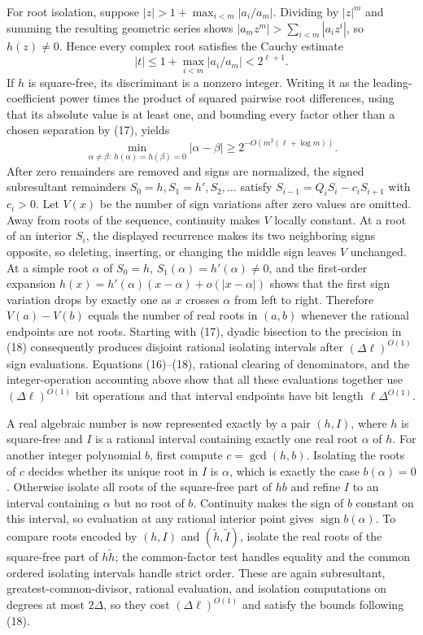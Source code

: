 For root isolation, suppose \(|z|>1+\max_{i<m}|a_i/a_m|\).  Dividing by \(|z|^m\) and summing the resulting geometric series shows \(|a_mz^m|>\sum_{i<m}|a_i z^i|\), so \(h(z)\ne0\).  Hence every complex root satisfies the Cauchy estimate
\[
|t|\le 1+\max_{i<m}|a_i/a_m|<2^{\ell+1}.
\tag{17}
\]
If \(h\) is square-free, its discriminant is a nonzero integer.  Writing it as the leading-coefficient power times the product of squared pairwise root differences, using that its absolute value is at least one, and bounding every factor other than a chosen separation by (17), yields
\[
\min_{\alpha\ne\beta:\ h(\alpha)=h(\beta)=0}|\alpha-\beta|
\ge 2^{-O(m^2(\ell+\log m))}.
\tag{18}
\]
After zero remainders are removed and signs are normalized, the signed subresultant remainders \(S_0=h,S_1=h',S_2,\ldots\) satisfy \(S_{i-1}=Q_iS_i-c_iS_{i+1}\) with \(c_i>0\).  Let \(V(x)\) be the number of sign variations after zero values are omitted.  Away from roots of the sequence, continuity makes \(V\) locally constant.  At a root of an interior \(S_i\), the displayed recurrence makes its two neighboring signs opposite, so deleting, inserting, or changing the middle sign leaves \(V\) unchanged.  At a simple root \(\alpha\) of \(S_0=h\), \(S_1(\alpha)=h'(\alpha)\ne0\), and the first-order expansion \(h(x)=h'(\alpha)(x-\alpha)+o(|x-\alpha|)\) shows that the first sign variation drops by exactly one as \(x\) crosses \(\alpha\) from left to right.  Therefore \(V(a)-V(b)\) equals the number of real roots in \((a,b)\) whenever the rational endpoints are not roots.  Starting with (17), dyadic bisection to the precision in (18) consequently produces disjoint rational isolating intervals after \((\Delta\ell)^{O(1)}\) sign evaluations.  Equations (16)--(18), rational clearing of denominators, and the integer-operation accounting above show that all these evaluations together use \((\Delta\ell)^{O(1)}\) bit operations and that interval endpoints have bit length \(\ell\Delta^{O(1)}\).

A real algebraic number is now represented exactly by a pair \((h,I)\), where \(h\) is square-free and \(I\) is a rational interval containing exactly one real root \(\alpha\) of \(h\).  For another integer polynomial \(b\), first compute \(c=\gcd(h,b)\).  Isolating the roots of \(c\) decides whether its unique root in \(I\) is \(\alpha\), which is exactly the case \(b(\alpha)=0\).  Otherwise isolate all roots of the square-free part of \(hb\) and refine \(I\) to an interval containing \(\alpha\) but no root of \(b\).  Continuity makes the sign of \(b\) constant on this interval, so evaluation at any rational interior point gives \(\operatorname{sign}b(\alpha)\).  To compare roots encoded by \((h,I)\) and \((\widetilde h,\widetilde I)\), isolate the real roots of the square-free part of \(h\widetilde h\); the common-factor test handles equality and the common ordered isolating intervals handle strict order.  These are again subresultant, greatest-common-divisor, rational evaluation, and isolation computations on degrees at most \(2\Delta\), so they cost \((\Delta\ell)^{O(1)}\) and satisfy the bounds following (18).

